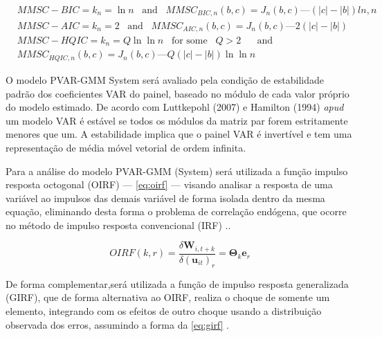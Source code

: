\documentclass[
  12pt,
  12pt,
  openright,
  oneside,
  a4paper,
  chapter=TITLE,
  section=TITLE,
  subsection=TITLE,
  subsubsection=TITLE,
  english,
  portugues,
  sumario=tradicional]{abntex2}
\begin{document}
\begin{equation}\label{eq:andrewslu}
\begin{aligned}{}
& MMSC-BIC = k_{n} = \ln n \hspace{10pt} \text{and} \hspace{10pt} MMSC_{BIC,n}(b,c) = J_{n}(b,c) — (|c| - |b| )ln,n \\
& MMSC-AIC = k_{n} = 2 \hspace{10pt} \text{and} \hspace{10pt} 
MMSC_{AIC,n}(b,c) = J_{n}(b,c) — 2(|c| - |b| ) \\
& MMSC-HQIC = k_{n} = Q \ln \ln n  \hspace{10pt} \text{for some} \hspace{10pt} Q > 2 \hspace{10pt} \hspace{10pt} \text{and} \hspace{10pt}  \\
& MMSC_{HQIC,n}(b,c) = J_{n}(b,c) — Q(|c| - |b|)\ln\ln n
\end{aligned}
\end{equation}

O modelo PVAR-GMM System será avaliado pela condição de estabilidade padrão dos coeficientes VAR do painel, baseado no módulo de cada valor próprio do modelo estimado. De acordo com Luttkepohl (2007) e Hamilton (1994) \emph{apud} \textcite{sigmund:2008} um modelo VAR é estável se todos os módulos da matriz par forem estritamente menores que um. A estabilidade implica que o painel VAR é invertível e tem uma representação de média móvel vetorial de ordem infinita.

Para a análise do modelo PVAR-GMM (System) será utilizada a função impulso resposta octogonal (OIRF) --- \autoref{eq:oirf} --- visando analisar a resposta de uma variável ao impulsos das demais variável de forma isolada dentro da mesma equação, eliminando desta forma o problema de correlação endógena, que ocorre no método de impulso resposta convencional (IRF) \cite{sigmund:2008}..

\begin{equation}\label{eq:oirf}
OIRF(k,r) = \frac{\delta\mathbf{W}_{i,t+k}}{\delta(\mathbf{u}_{it})_{r}} = \mathbf{\Theta}_{k}\mathbf{e}_{r}  
\end{equation}

De forma complementar,será utilizada a função de impulso resposta generalizada (GIRF), que de forma alternativa ao OIRF, realiza o choque de somente um elemento, integrando com os efeitos de outro choque usando a distribuição observada dos erros, assumindo a forma da \autoref{eq:girf} \cite{sigmund:2008}.
\end{document}
